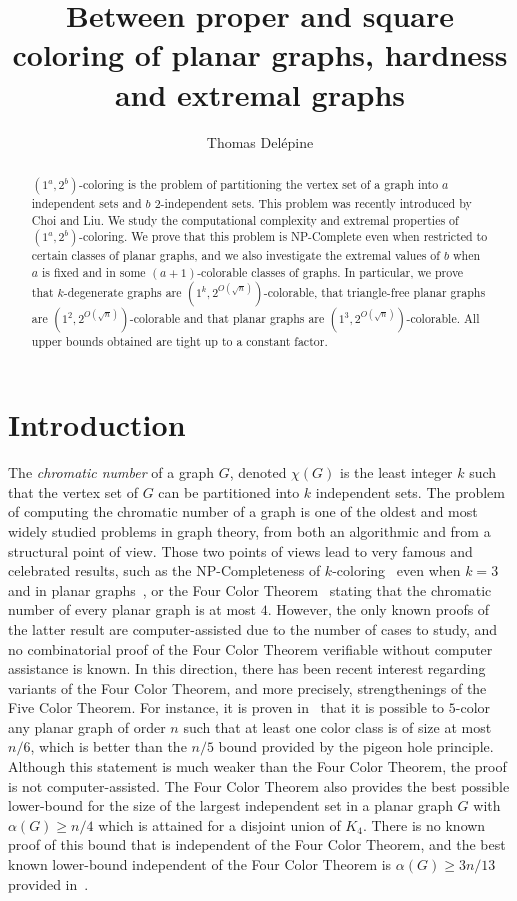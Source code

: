 \documentclass{article}
\title{Between proper and square coloring of planar graphs, hardness and extremal graphs}
\author[]{Thomas Del\'epine}
\affil[]{LIRMM, Univ Montpellier, CNRS, Montpellier, France}
\date{}
\newcommand{\colo}[2]{(1^{#1}, 2^{#2})}
\begin{document}
\maketitle
\begin{abstract}
{\sc$\colo{a}{b}$-coloring} is the problem of partitioning the vertex set of a graph into $a$ independent sets and $b$ 2-independent sets. This problem was recently introduced by Choi and Liu. We study the computational complexity and extremal properties of {\sc$\colo{a}{b}$-coloring}. We prove that this problem is NP-Complete even when restricted to certain classes of planar graphs, and we also investigate the extremal values of $b$ when $a$ is fixed and in some $(a + 1)$-colorable classes of graphs. In particular, we prove that $k$-degenerate graphs are $\colo{k}{O(\sqrt{n})}$-colorable, that triangle-free planar graphs are $\colo{2}{O(\sqrt{n})}$-colorable and that planar graphs are $\colo{3}{O(\sqrt{n})}$-colorable. All upper bounds obtained are tight up to a constant factor.
\end{abstract}

\section{Introduction}


The \emph{chromatic number} of a graph $G$, denoted $\chi(G)$ is the least integer $k$ such that the vertex set of $G$ can be partitioned into $k$ independent sets. The problem of computing the chromatic number of a graph is one of the oldest and most widely studied problems in graph theory, from both an algorithmic and from a structural point of view. Those two points of views lead to very famous and celebrated results, such as the NP-Completeness of {$k$-coloring}~\cite{Karp1972} even when $k = 3$ and in planar graphs~\cite{GAREY1976237}, or the Four Color Theorem~\cite{appel1976every, appel1977every, ROBERTSON19972} stating that the chromatic number of every planar graph is at most $4$. However, the only known proofs of the latter result are computer-assisted due to the number of cases to study, and no combinatorial proof of the Four Color Theorem verifiable without computer assistance is known. In this direction, there has been recent interest regarding variants of the Four Color Theorem, and more precisely, strengthenings of the Five Color Theorem. For instance, it is proven in~\cite{inoue20255} that it is possible to $5$-color any planar graph of order $n$ such that at least one color class is of size at most $n/6$, which is better than the $n/5$ bound provided by the pigeon hole principle. Although this statement is much weaker than the Four Color Theorem, the proof is not computer-assisted. The Four Color Theorem also provides the best possible lower-bound for the size of the largest independent set in a planar graph $G$ with $\alpha(G) \geq n/4$ which is attained for a disjoint union of $K_4$. There is no known proof of this bound that is independent of the Four Color Theorem, and the best known lower-bound independent of the Four Color Theorem is $\alpha(G) \geq 3n/13$ provided in~\cite{cranston2016planargraphsindependenceratio}.  
\end{document}
